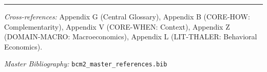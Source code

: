 \vspace{1em}
\hrule
\vspace{0.5em}

\noindent\textit{Cross-references:}
Appendix G (Central Glossary),
Appendix B (CORE-HOW: Complementarity),
Appendix V (CORE-WHEN: Context),
Appendix Z (DOMAIN-MACRO: Macroeconomics),
Appendix L (LIT-THALER: Behavioral Economics).

\noindent\textit{Master Bibliography:} \texttt{bcm2\_master\_references.bib}


